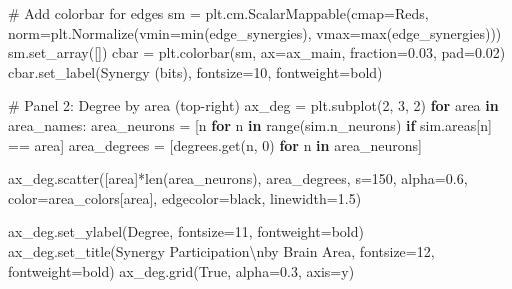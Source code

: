 \documentclass[
  11pt,
  letterpaper,
  oneside,
  openany]{book}
\newenvironment{Shaded}{\begin{snugshade}}{\end{snugshade}}
\newcommand{\BuiltInTok}[1]{\textcolor[rgb]{0.00,0.23,0.31}{#1}}
\newcommand{\CharTok}[1]{\textcolor[rgb]{0.13,0.47,0.30}{#1}}
\newcommand{\CommentTok}[1]{\textcolor[rgb]{0.37,0.37,0.37}{#1}}
\newcommand{\ControlFlowTok}[1]{\textcolor[rgb]{0.00,0.23,0.31}{\textbf{#1}}}
\newcommand{\DecValTok}[1]{\textcolor[rgb]{0.68,0.00,0.00}{#1}}
\newcommand{\FloatTok}[1]{\textcolor[rgb]{0.68,0.00,0.00}{#1}}
\newcommand{\KeywordTok}[1]{\textcolor[rgb]{0.00,0.23,0.31}{\textbf{#1}}}
\newcommand{\NormalTok}[1]{\textcolor[rgb]{0.00,0.23,0.31}{#1}}
\newcommand{\OperatorTok}[1]{\textcolor[rgb]{0.37,0.37,0.37}{#1}}
\newcommand{\StringTok}[1]{\textcolor[rgb]{0.13,0.47,0.30}{#1}}
\newcommand{\VariableTok}[1]{\textcolor[rgb]{0.07,0.07,0.07}{#1}}
\begin{document}
\begin{Shaded}
\begin{Highlighting}[]
\CommentTok{\# Add colorbar for edges}
\NormalTok{sm }\OperatorTok{=}\NormalTok{ plt.cm.ScalarMappable(cmap}\OperatorTok{=}\StringTok{\textquotesingle{}Reds\textquotesingle{}}\NormalTok{, }
\NormalTok{                          norm}\OperatorTok{=}\NormalTok{plt.Normalize(vmin}\OperatorTok{=}\BuiltInTok{min}\NormalTok{(edge\_synergies), }
\NormalTok{                                           vmax}\OperatorTok{=}\BuiltInTok{max}\NormalTok{(edge\_synergies)))}
\NormalTok{sm.set\_array([])}
\NormalTok{cbar }\OperatorTok{=}\NormalTok{ plt.colorbar(sm, ax}\OperatorTok{=}\NormalTok{ax\_main, fraction}\OperatorTok{=}\FloatTok{0.03}\NormalTok{, pad}\OperatorTok{=}\FloatTok{0.02}\NormalTok{)}
\NormalTok{cbar.set\_label(}\StringTok{\textquotesingle{}Synergy (bits)\textquotesingle{}}\NormalTok{, fontsize}\OperatorTok{=}\DecValTok{10}\NormalTok{, fontweight}\OperatorTok{=}\StringTok{\textquotesingle{}bold\textquotesingle{}}\NormalTok{)}

\CommentTok{\# Panel 2: Degree by area (top{-}right)}
\NormalTok{ax\_deg }\OperatorTok{=}\NormalTok{ plt.subplot(}\DecValTok{2}\NormalTok{, }\DecValTok{3}\NormalTok{, }\DecValTok{2}\NormalTok{)}
\ControlFlowTok{for}\NormalTok{ area }\KeywordTok{in}\NormalTok{ area\_names:}
\NormalTok{    area\_neurons }\OperatorTok{=}\NormalTok{ [n }\ControlFlowTok{for}\NormalTok{ n }\KeywordTok{in} \BuiltInTok{range}\NormalTok{(sim.n\_neurons) }\ControlFlowTok{if}\NormalTok{ sim.areas[n] }\OperatorTok{==}\NormalTok{ area]}
\NormalTok{    area\_degrees }\OperatorTok{=}\NormalTok{ [degrees.get(n, }\DecValTok{0}\NormalTok{) }\ControlFlowTok{for}\NormalTok{ n }\KeywordTok{in}\NormalTok{ area\_neurons]}
    
\NormalTok{    ax\_deg.scatter([area]}\OperatorTok{*}\BuiltInTok{len}\NormalTok{(area\_neurons), area\_degrees, }
\NormalTok{                  s}\OperatorTok{=}\DecValTok{150}\NormalTok{, alpha}\OperatorTok{=}\FloatTok{0.6}\NormalTok{, color}\OperatorTok{=}\NormalTok{area\_colors[area], }
\NormalTok{                  edgecolor}\OperatorTok{=}\StringTok{\textquotesingle{}black\textquotesingle{}}\NormalTok{, linewidth}\OperatorTok{=}\FloatTok{1.5}\NormalTok{)}

\NormalTok{ax\_deg.set\_ylabel(}\StringTok{\textquotesingle{}Degree\textquotesingle{}}\NormalTok{, fontsize}\OperatorTok{=}\DecValTok{11}\NormalTok{, fontweight}\OperatorTok{=}\StringTok{\textquotesingle{}bold\textquotesingle{}}\NormalTok{)}
\NormalTok{ax\_deg.set\_title(}\StringTok{\textquotesingle{}Synergy Participation}\CharTok{\textbackslash{}n}\StringTok{by Brain Area\textquotesingle{}}\NormalTok{, fontsize}\OperatorTok{=}\DecValTok{12}\NormalTok{, fontweight}\OperatorTok{=}\StringTok{\textquotesingle{}bold\textquotesingle{}}\NormalTok{)}
\NormalTok{ax\_deg.grid(}\VariableTok{True}\NormalTok{, alpha}\OperatorTok{=}\FloatTok{0.3}\NormalTok{, axis}\OperatorTok{=}\StringTok{\textquotesingle{}y\textquotesingle{}}\NormalTok{)}


\end{Highlighting}
\end{Shaded}
\end{document}

